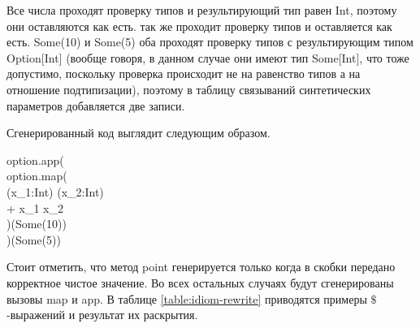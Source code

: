 Все числа проходят проверку типов и результирующий тип равен \<Int\>, поэтому они оставляются как есть.  \> так же проходит проверку типов и оставляется как есть. \<Some(10)\> и \<Some(5)\> оба проходят проверку типов с результирующим типом \<Option[Int]\> (вообще говоря, в данном случае они имеют тип \<Some[Int]\>, что тоже допустимо, поскольку проверка происходит не на равенство типов а на отношение подтипизации), поэтому в таблицу связываний синтетических параметров добавляется две записи.

Сгенерированный код выглядит следующим образом.

\begin{haskell}
option.app( \\
\quad\quad option.map( \\
\quad\quad\quad (x_1:Int) \Rightarrow (x_2:Int) \Rightarrow \\
\quad\quad\quad{}  + x_1 \times x_2 \\
\quad\quad )(Some(10)) \\
)(Some(5))
\end{haskell}


Стоит отметить, что метод \<point\> генерируется только когда в скобки передано корректное чистое значение. Во всех остальных случаях будут сгенерированы вызовы \<map\> и \<app\>. В таблице \ref{table:idiom-rewrite} приводятся примеры $\$$-выражений и результат их раскрытия.

